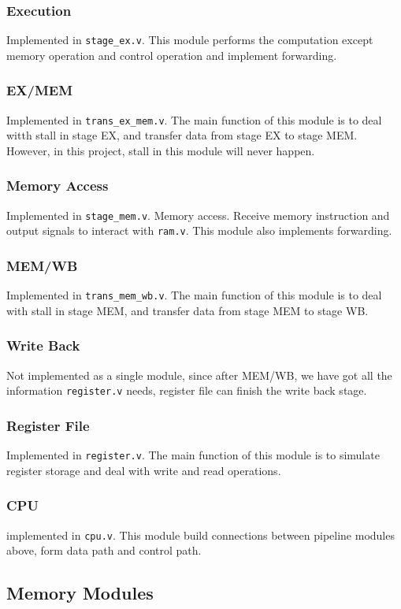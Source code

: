 \documentclass[paper=a4, fontsize=11pt]{scrartcl} %
\numberwithin{equation}{section} %
\numberwithin{figure}{section} %
\numberwithin{table}{section} %
\begin{document}
\begin{spacing}{1.5}
    	\subsubsection{Execution} Implemented in \verb|stage_ex.v|. This module performs the computation except memory operation and control operation and implement forwarding.
    	\subsubsection{EX/MEM} Implemented in \verb|trans_ex_mem.v|. The main function of this module is to deal witth stall in stage EX, and transfer data from stage EX to stage MEM. However, in this project, stall in this module will never happen.
    	\subsubsection{Memory Access} Implemented in \verb|stage_mem.v|. Memory access. Receive memory instruction and output signals to interact with \verb|ram.v|. This module also implements forwarding.
    	\subsubsection{MEM/WB} Implemented in \verb|trans_mem_wb.v|. The main function of this module is to deal with stall in stage MEM, and transfer data from stage  MEM to stage WB.
    	\subsubsection{Write Back} Not implemented as a single module, since after MEM/WB, we have got all the information \verb|register.v| needs, register file can finish the write back stage.
		\subsubsection{Register File} Implemented in \verb|register.v|. The main function of this module is to simulate register storage and deal with write and read operations.
		\subsubsection{CPU} implemented in \verb|cpu.v|. This module build connections between pipeline modules above, form data path and control path.
    \subsection{Memory Modules}

\end{spacing}
\end{document}
